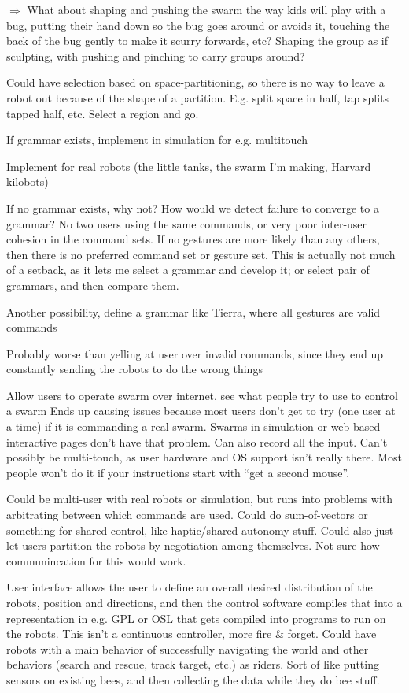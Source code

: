 \documentclass[]{article}
\begin{document}
$\Rightarrow$ What about shaping and pushing the swarm the way kids will play with a bug, putting their hand down so the bug goes around or avoids it, touching the back of the bug gently to make it scurry forwards, etc? Shaping the group as if sculpting, with pushing and pinching to carry groups around?

Could have selection based on space-partitioning, so there is no way to leave a robot out because of the shape of a partition. E.g. split space in half, tap splits tapped half, etc. Select a region and go. 

If grammar exists, implement in simulation for e.g. multitouch

Implement for real robots (the little tanks, the swarm I'm making, Harvard kilobots)

If no grammar exists, why not?
How would we detect failure to converge to a grammar? No two users using the same commands, or very poor inter-user cohesion in the command sets. If no gestures are more likely than any others, then there is no preferred command set or gesture set. 
This is actually not much of a setback, as it lets me select a grammar and develop it; or select pair of grammars, and then compare them.

Another possibility, define a grammar like Tierra, where all gestures are valid commands

Probably worse than yelling at user over invalid commands, since they end up constantly sending the robots to do the wrong things

Allow users to operate swarm over internet, see what people try to use to control a swarm
Ends up causing issues because most users don't get to try (one user at a time) if it is commanding a real swarm. Swarms in simulation or web-based interactive pages don't have that problem. Can also record all the input. 
Can't possibly be multi-touch, as user hardware and OS support isn't really there. Most people won't do it if your instructions start with ``get a second mouse''. 

Could be multi-user with real robots or simulation, but runs into problems with arbitrating between which commands are used. Could do sum-of-vectors or something for shared control, like haptic/shared autonomy stuff. Could also just let users partition the robots by negotiation among themselves. Not sure how communincation for this would work. 

User interface allows the user to define an overall desired distribution of the robots, position and directions, and then the control software compiles that into a representation in e.g. GPL or OSL that gets compiled into programs to run on the robots. This isn't a continuous controller, more fire \& forget. Could have robots with a main behavior of successfully navigating the world and other behaviors (search and rescue, track target, etc.) as riders. Sort of like putting sensors on existing bees, and then collecting the data while they do bee stuff. 
\end{document}
